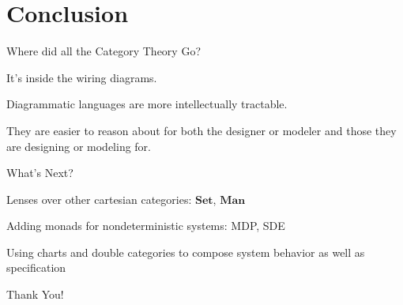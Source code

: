 \documentclass{beamer}
\begin{document}
\section{Conclusion}


\begin{frame}{Where did all the Category Theory Go?}
    \begin{large}
        It's inside the wiring diagrams.

        \vspace*{0.25in}
        Diagrammatic languages are more intellectually tractable.

        \vspace*{0.25in}
        They are easier to reason about for both the designer or modeler and those they are designing or modeling for.

    \end{large}

\end{frame}


\begin{frame}{What's Next?}
    \begin{large}
        Lenses over other cartesian categories: $\textbf{Set}$, $\textbf{Man}$

        \vspace*{0.25in}
        Adding monads for nondeterministic systems: MDP, SDE

        \vspace*{0.25in}
        Using charts and double categories to compose system behavior as well as specification
    \end{large}

\end{frame}




\begin{frame}{}
    \begin{center}
        \begin{Huge}
            Thank You!
        \end{Huge}
    \end{center}
\end{frame}
\end{document}
